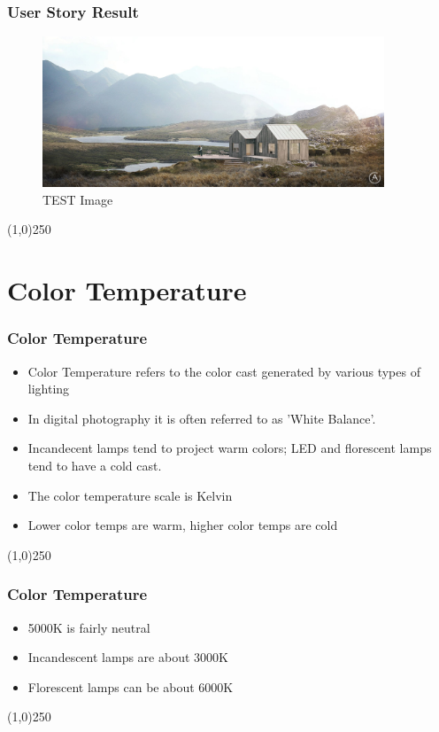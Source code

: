 \begin{frame}
\frametitle{User Story Result}
\begin{figure}
	\centering
		\includegraphics[height=4.5cm]{img/cabana_01_large.jpg}
	\caption{TEST Image}
	\label{fig:Cabana}
\end{figure}
\end{frame}
\begin{center}\line(1,0){250}\end{center}


\section{Color Temperature}

\begin{frame}
\frametitle{Color Temperature}
\begin{itemize}
	\item Color Temperature refers to the color cast generated by various types of lighting
	\item In digital photography it is often referred to as 'White Balance'.
	\item Incandecent lamps tend to project warm colors; LED and florescent lamps tend to have a cold cast.
	\item The color temperature scale is Kelvin
	\item Lower color temps are warm, higher color temps are cold
\end{itemize}
\end{frame}
\begin{center}\line(1,0){250}\end{center}

\begin{frame}
\frametitle{Color Temperature}
\begin{itemize}
	\item 5000K is fairly neutral
	\item Incandescent lamps are about 3000K
	\item Florescent lamps can be about 6000K
\end{itemize}
\end{frame}
\begin{center}\line(1,0){250}\end{center}



